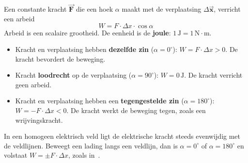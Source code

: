 \documentclass{ximera}
\begin{document}
\begin{proposition}[title={Arbeid van een constante kracht}]\nl
    Een constante kracht $\vec{\mathbf{F}}$ die een hoek $\alpha$ maakt met de verplaatsing $\Delta \vec{\mathbf{x}}$, verricht een arbeid
    \begin{equation}\label{eq:arbeid}
        W = F \cdot \Delta x \cdot \cos \alpha
    \end{equation}
    Arbeid is een scalaire grootheid. De eenheid is de \textbf{joule}: $1 \, \mathrm{J} = 1 \, \mathrm{N \cdot m}$.
\end{proposition}

\begin{proposition}[title={Teken van de arbeid}]\nl
    \begin{itemize}
        \item Kracht en verplaatsing hebben \textbf{dezelfde zin} ($\alpha = 0^\circ$): $W = F \cdot \Delta x > 0$. De kracht bevordert de beweging.
        \item Kracht \textbf{loodrecht} op de verplaatsing ($\alpha = 90^\circ$): $W = 0 \, \mathrm{J}$. De kracht verricht geen arbeid.
        \item Kracht en verplaatsing hebben een \textbf{tegengestelde zin} ($\alpha = 180^\circ$): $W = -F \cdot \Delta x < 0$. De kracht werkt de beweging tegen, zoals een wrijvingskracht.
    \end{itemize}
\end{proposition}

\begin{remark}[title={Arbeid in het hoofdstuk potentiaal}]\nl
    In een homogeen elektrisch veld ligt de elektrische kracht steeds evenwijdig met de veldlijnen. Beweegt een lading langs een veldlijn, dan is $\alpha = 0^\circ$ of $\alpha = 180^\circ$ en volstaat $W = \pm F \cdot \Delta x$, zoals in~.
\end{remark}
\end{document}
